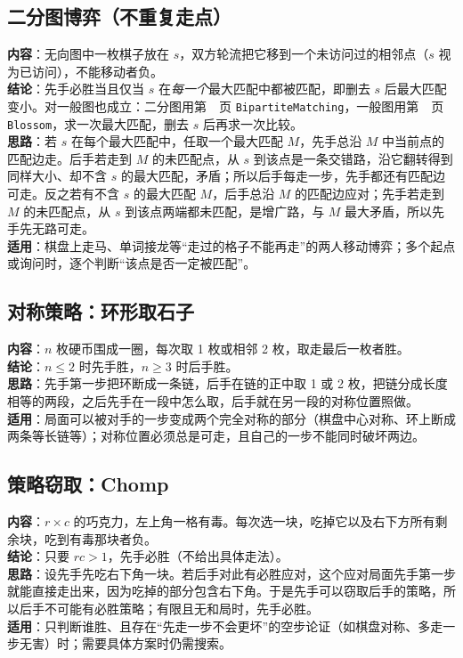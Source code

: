 \subsection{二分图博弈（不重复走点）}\label{knowledge-game-matching}
\textbf{内容}：无向图中一枚棋子放在 $s$，双方轮流把它移到一个未访问过的相邻点（$s$ 视为已访问），不能移动者负。\\
\textbf{结论}：先手必胜当且仅当 $s$ 在\emph{每一个}最大匹配中都被匹配，即删去 $s$ 后最大匹配变小。对一般图也成立：二分图用第~\pageref{compact-BipartiteMatching}~页 \texttt{BipartiteMatching}，一般图用第~\pageref{compact-Blossom}~页 \texttt{Blossom}，求一次最大匹配，删去 $s$ 后再求一次比较。\\
\textbf{思路}：若 $s$ 在每个最大匹配中，任取一个最大匹配 $M$，先手总沿 $M$ 中当前点的匹配边走。后手若走到 $M$ 的未匹配点，从 $s$ 到该点是一条交错路，沿它翻转得到同样大小、却不含 $s$ 的最大匹配，矛盾；所以后手每走一步，先手都还有匹配边可走。反之若有不含 $s$ 的最大匹配 $M$，后手总沿 $M$ 的匹配边应对；先手若走到 $M$ 的未匹配点，从 $s$ 到该点两端都未匹配，是增广路，与 $M$ 最大矛盾，所以先手先无路可走。\\
\textbf{适用}：棋盘上走马、单词接龙等“走过的格子不能再走”的两人移动博弈；多个起点或询问时，逐个判断“该点是否一定被匹配”。



\subsection{对称策略：环形取石子}\label{knowledge-game-symmetry}
\textbf{内容}：$n$ 枚硬币围成一圈，每次取 1 枚或相邻 2 枚，取走最后一枚者胜。\\
\textbf{结论}：$n\le2$ 时先手胜，$n\ge3$ 时后手胜。\\
\textbf{思路}：先手第一步把环断成一条链，后手在链的正中取 1 或 2 枚，把链分成长度相等的两段，之后先手在一段中怎么取，后手就在另一段的对称位置照做。\\
\textbf{适用}：局面可以被对手的一步变成两个完全对称的部分（棋盘中心对称、环上断成两条等长链等）；对称位置必须总是可走，且自己的一步不能同时破坏两边。



\subsection{策略窃取：Chomp}\label{knowledge-game-chomp}
\textbf{内容}：$r\times c$ 的巧克力，左上角一格有毒。每次选一块，吃掉它以及右下方所有剩余块，吃到有毒那块者负。\\
\textbf{结论}：只要 $rc>1$，先手必胜（不给出具体走法）。\\
\textbf{思路}：设先手先吃右下角一块。若后手对此有必胜应对，这个应对局面先手第一步就能直接走出来，因为吃掉的部分包含右下角。于是先手可以窃取后手的策略，所以后手不可能有必胜策略；有限且无和局时，先手必胜。\\
\textbf{适用}：只判断谁胜、且存在“先走一步不会更坏”的空步论证（如棋盘对称、多走一步无害）时；需要具体方案时仍需搜索。


